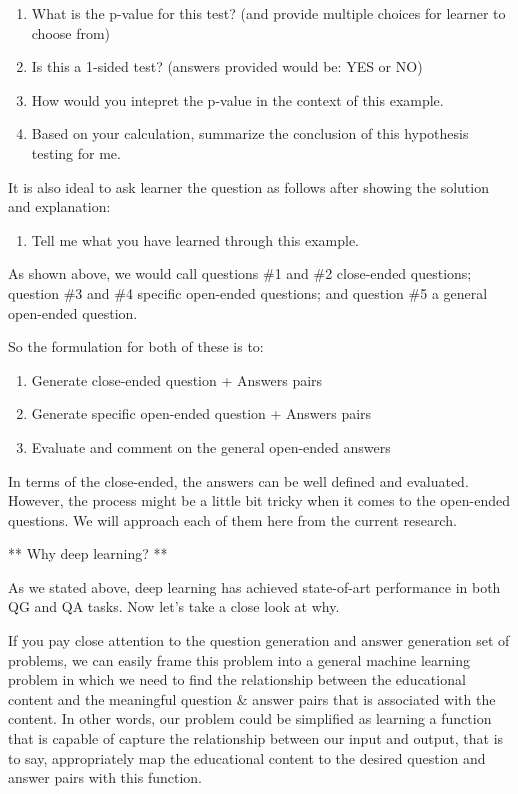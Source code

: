 \documentclass[]{book}
\providecommand{\tightlist}{%
  \setlength{\itemsep}{0pt}\setlength{\parskip}{0pt}}
\theoremstyle{definition}
\theoremstyle{definition}
\theoremstyle{definition}
\theoremstyle{remark}
\begin{document}
\begin{enumerate}
\def\labelenumi{\arabic{enumi}.}
\item
  What is the p-value for this test? (and provide multiple choices for
  learner to choose from)
\item
  Is this a 1-sided test? (answers provided would be: YES or NO)
\item
  How would you intepret the p-value in the context of this example.
\item
  Based on your calculation, summarize the conclusion of this hypothesis
  testing for me.
\end{enumerate}

It is also ideal to ask learner the question as follows after showing
the solution and explanation:

\begin{enumerate}
\def\labelenumi{\arabic{enumi}.}
\setcounter{enumi}{4}
\tightlist
\item
  Tell me what you have learned through this example.
\end{enumerate}

As shown above, we would call questions \#1 and \#2 close-ended
questions; question \#3 and \#4 specific open-ended questions; and
question \#5 a general open-ended question.

So the formulation for both of these is to:

\begin{enumerate}
\def\labelenumi{\arabic{enumi}.}
\item
  Generate close-ended question + Answers pairs
\item
  Generate specific open-ended question + Answers pairs
\item
  Evaluate and comment on the general open-ended answers
\end{enumerate}

In terms of the close-ended, the answers can be well defined and
evaluated. However, the process might be a little bit tricky when it
comes to the open-ended questions. We will approach each of them here
from the current research.

** Why deep learning? **

As we stated above, deep learning has achieved state-of-art performance
in both QG and QA tasks. Now let's take a close look at why.

If you pay close attention to the question generation and answer
generation set of problems, we can easily frame this problem into a
general machine learning problem in which we need to find the
relationship between the educational content and the meaningful question
\& answer pairs that is associated with the content. In other words, our
problem could be simplified as learning a function that is capable of
capture the relationship between our input and output, that is to say,
appropriately map the educational content to the desired question and
answer pairs with this function.
\end{document}
